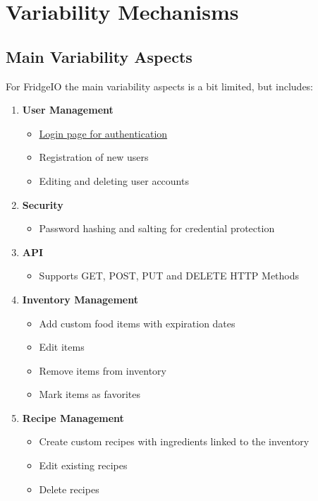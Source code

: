 \section{Variability Mechanisms}

\subsection{Main Variability Aspects}
For FridgeIO the main variability aspects is a bit limited, but includes:

\begin{enumerate}
    \item \textbf{User Management}
    \begin{itemize}
        \item \hyperref[fig:FridgeIOLogin]{Login page for authentication}
        \item Registration of new users
        \item Editing and deleting user accounts
    \end{itemize}

    \item \textbf{Security}
    \begin{itemize}
        \item Password hashing and salting for credential protection
    \end{itemize}

    \item \textbf{API}
    \begin{itemize}
        \item Supports GET, POST, PUT and DELETE HTTP Methods
    \end{itemize}

    \item \textbf{Inventory Management}
    \begin{itemize}
        \item Add custom food items with expiration dates
        \item Edit items
        \item Remove items from inventory
        \item Mark items as favorites
    \end{itemize}

    \item \textbf{Recipe Management}
    \begin{itemize}
        \item Create custom recipes with ingredients linked to the inventory
        \item Edit existing recipes
        \item Delete recipes
    \end{itemize}
\end{enumerate}


